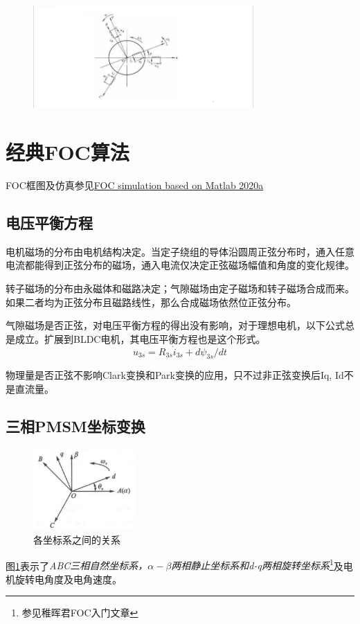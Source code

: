 \documentclass[main.tex]{subfiles}
\begin{document}
\begin{figure}[htbp]
	\centering
	\includegraphics[width=0.75\textwidth]{img/img_1.1.png}
\end{figure}
\section{经典FOC算法}
FOC框图及仿真参见\href{https://github.com/Ding-Kaiyue/FOC_Simulation}{FOC simulation based on Matlab 2020a}
\subsection{电压平衡方程}
电机磁场的分布由电机结构决定。当定子绕组的导体沿圆周正弦分布时，通入任意电流都能得到正弦分布的磁场，通入电流仅决定正弦磁场幅值和角度的变化规律。

转子磁场的分布由永磁体和磁路决定；气隙磁场由定子磁场和转子磁场合成而来。如果二者均为正弦分布且磁路线性，那么合成磁场依然位正弦分布。

气隙磁场是否正弦，对电压平衡方程的得出没有影响，对于理想电机，以下公式总是成立。扩展到BLDC电机，其电压平衡方程也是这个形式。
\[
	u_{3s} = R_{3s}\dot i_{3s} + d\psi_{3s}/dt	
\]

物理量是否正弦不影响Clark变换和Park变换的应用，只不过非正弦变换后Iq, Id不是直流量。

\subsection{三相PMSM坐标变换}
\begin{figure}[H]
	\centering
	\includegraphics[width=0.35\textwidth]{img/img_1.1.1.png}
	\caption{各坐标系之间的关系}
	\label{各坐标系之间的关系}
\end{figure}
图\ref{各坐标系之间的关系}表示了\emph{ABC三相自然坐标系，$\alpha-\beta$两相静止坐标系和d-q两相旋转坐标系}\footnote{参见稚晖君FOC入门文章}及电机旋转电角度及电角速度。
\end{document}
